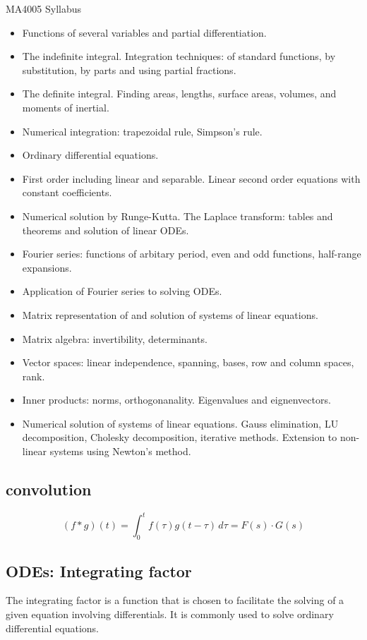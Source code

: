 \documentclass[12pt, a4paper]{article}
\begin{document}
\author{Kevin O'Brien}

MA4005 Syllabus
\begin{itemize}
\item Functions of several variables and partial differentiation.
\item The indefinite integral. Integration techniques: of standard functions, by substitution, by parts and using partial fractions.
\item The definite integral. Finding areas, lengths, surface areas, volumes, and moments of inertial.
\item Numerical integration: trapezoidal rule, Simpson's rule.
\item Ordinary differential equations.
\item First order including linear and separable. Linear second order equations with constant coefficients.
\item Numerical solution by Runge-Kutta. The Laplace transform: tables and theorems and solution of linear ODEs.
\item Fourier series: functions of arbitary period, even and odd functions, half-range expansions.
\item Application of Fourier series to solving ODEs.
\item Matrix representation of and solution of systems of linear equations.
\item Matrix algebra: invertibility, determinants.
\item Vector spaces: linear independence, spanning, bases, row and column spaces, rank.
\item Inner products: norms, orthogonanality. Eigenvalues and eignenvectors.
\item Numerical solution of systems of linear equations. Gauss elimination, LU decomposition, Cholesky decomposition,
iterative methods. Extension to non-linear systems using Newton's method.
\end{itemize}
\subsection{convolution}

\[ (f * g)(t) = \int_0^t f(\tau)g(t-\tau)\,d\tau= F(s) \cdot G(s) \]

\subsection{ODEs: Integrating factor}
The integrating factor is a function that is chosen to facilitate the solving of a given equation involving differentials. It is commonly used to solve ordinary differential equations.
\end{document}
